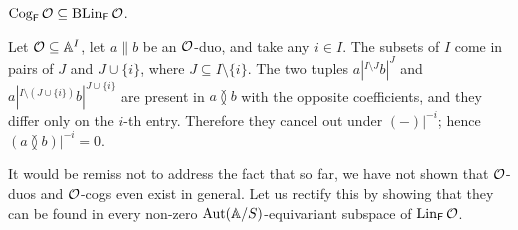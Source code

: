 \begin{claim}\label{claim:cogs-are-balanced}
    $\Cog_\FF \cal O\subseteq \Ker_\FF \cal O$.
\end{claim}
\begin{claimproof}
    Let $\cal O \subseteq \A^I$, let $a\parallel b$ be an $\cal O$-duo, and take any $i \in I$.
    The subsets of $I$ come in pairs of $J$ and $J \cup \{i\}$, where $J\subseteq I \setminus \{i\}$.
    The two tuples $a|^{I\setminus J} b|^{J}$ and $a|^{I \setminus (J \cup \{i\})}b|^{J \cup \{i\}}$ are present in 
    $a\between b$ with the opposite coefficients, and they differ only on the $i$-th entry.
    Therefore they cancel out under $(-)|^{-i}$; hence $(a \between b )|^{-i} = 0$.
\end{claimproof}

It would be remiss not to address the fact that so far, we have not shown that $\cal O$-duos and $\cal O$-cogs even exist in general.
Let us rectify this by showing that they can be found in every non-zero $\Aut(\A/S)$-equivariant subspace of $\Lin_\FF{\cal O}$.


